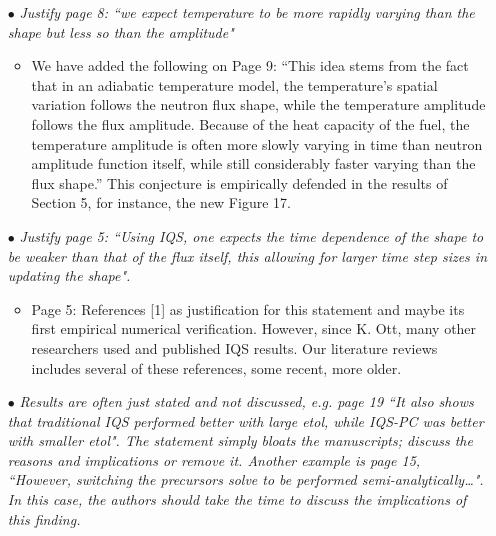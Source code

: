 \documentclass[11pt]{letter}
\newcommand{\iqspc}{IQS-PC\xspace}
\newcommand{\working}{$\bullet$}
\newcommand{\done}{$\bullet$}
\newcommand{\easy}[1]{{\textit{#1}}}
\newcommand{\medm}[1]{{\textit{#1}}}
\begin{document}
\begin{itemize}

\item[\done] \medm{ Justify page 8: ``we expect temperature to be more rapidly varying than the shape but less so than the amplitude" }
\begin{itemize}
\item We have added the following on Page 9: ``This idea stems from the fact that in an adiabatic temperature model, the temperature's spatial variation follows the neutron flux shape, while the temperature amplitude follows the flux amplitude. Because of the heat capacity of the fuel, the temperature amplitude is often more slowly varying in time than neutron amplitude function itself, while still considerably faster varying than the flux shape.'' This conjecture is empirically defended in the results of Section 5, for instance, the new Figure 17.
\end{itemize}

\item[\done] \easy{ Justify page 5: ``Using IQS, one expects the time dependence of the shape to be weaker than that of the flux itself, this allowing for larger time step sizes in updating the shape". }
\begin{itemize}
\item Page 5: References [1] as justification for this statement and maybe its first empirical numerical verification. However, since K. Ott, many other researchers used and published IQS results. Our literature reviews includes several of these references, some recent, more older.
\end{itemize}

\item[\working] \medm{  Results are often just stated and not discussed, e.g. page 19 ``It also shows that traditional IQS performed better with large etol, while \iqspc was better with smaller etol". The statement simply bloats the manuscripts; discuss the reasons and implications or remove it. Another example is page 15, ``However, switching the precursors solve to be performed semi-analytically…".  In this case, the authors should take the time to discuss the implications of this finding. }


\end{itemize}
\end{document}
